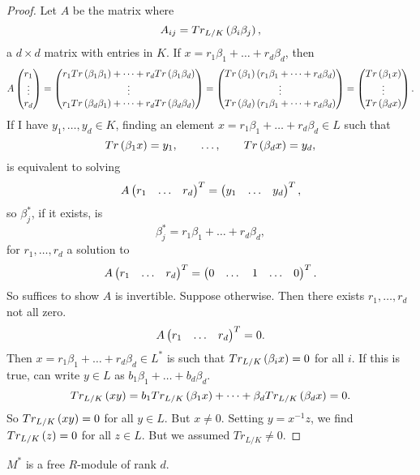 \begin{proof}
Let $ A $ be the matrix where
$$ A_{ij} = Tr_{L / K}\left( \beta_i\beta_j \right), $$
a $ d \times d $ matrix with entries in $ K $. If $ x = r_1\beta_1 + \dots + r_d\beta_d $, then
$$ A\begin{pmatrix}
r_1 \\
\vdots \\
r_d
\end{pmatrix} = \begin{pmatrix}
r_1Tr\left( \beta_1\beta_1 \right) + \dots + r_dTr\left( \beta_1\beta_d \right) \\
\vdots \\
r_1Tr\left( \beta_d\beta_1 \right) + \dots + r_dTr\left( \beta_d\beta_d \right)
\end{pmatrix} = \begin{pmatrix}
Tr\left( \beta_1 \right)\left( r_1\beta_1 + \dots + r_d\beta_d \right) \\
\vdots \\
Tr\left( \beta_d \right)\left( r_1\beta_1 + \dots + r_d\beta_d \right)
\end{pmatrix} = \begin{pmatrix}
Tr\left( \beta_1x \right) \\
\vdots \\
Tr\left( \beta_dx \right)
\end{pmatrix}. $$
If I have $ y_1, \dots, y_d \in K $, finding an element $ x = r_1\beta_1 + \dots + r_d\beta_d \in L $ such that
$$ Tr\left( \beta_1x \right) = y_1, \qquad \dots, \qquad Tr\left( \beta_dx \right) = y_d, $$
is equivalent to solving
$$ A\three{r_1}{\dots}{r_d}^T = \three{y_1}{\dots}{y_d}^T, $$
so $ \beta_j^* $, if it exists, is
$$ \beta_j^* = r_1\beta_1 + \dots + r_d\beta_d, $$
for $ r_1, \dots, r_d $ a solution to
$$ A\three{r_1}{\dots}{r_d}^T = \three{0}{\dots & 1 & \dots}{0}^T. $$
So suffices to show $ A $ is invertible. Suppose otherwise. Then there exists $ r_1, \dots, r_d $ not all zero.
$$ A\three{r_1}{\dots}{r_d}^T = 0. $$
Then $ x = r_1\beta_1 + \dots + r_d\beta_d \in L^* $ is such that $ Tr_{L / K}\left( \beta_ix \right) = 0 $ for all $ i $. If this is true, can write $ y \in L $ as $ b_1\beta_1 + \dots + b_d\beta_d $.
$$ Tr_{L / K}\left( xy \right) = b_1Tr_{L / K}\left( \beta_1x \right) + \dots + \beta_dTr_{L / K}\left( \beta_dx \right) = 0. $$
So $ Tr_{L / K}\left( xy \right) = 0 $ for all $ y \in L $. But $ x \ne 0 $. Setting $ y = x^{-1}z $, we find $ Tr_{L / K}\left( z \right) = 0 $ for all $ z \in L $. But we assumed $ Tr_{L / K} \ne 0 $.
\end{proof}

\begin{corollary}
$ M^* $ is a free $ R $-module of rank $ d $.
\end{corollary}

